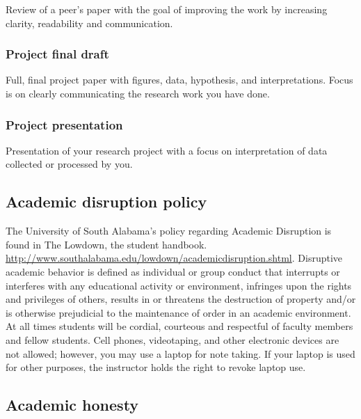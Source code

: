 \documentclass[11pt,]{article}
\begin{document}
Review of a peer's paper with the goal of improving the work by
increasing clarity, readability and communication.

\hypertarget{project-final-draft}{%
\subsubsection{Project final draft}\label{project-final-draft}}

Full, final project paper with figures, data, hypothesis, and
interpretations. Focus is on clearly communicating the research work you
have done.

\hypertarget{project-presentation}{%
\subsubsection{Project presentation}\label{project-presentation}}

Presentation of your research project with a focus on interpretation of
data collected or processed by you.

\newpage

\hypertarget{academic-disruption-policy}{%
\subsection{Academic disruption
policy}\label{academic-disruption-policy}}

The University of South Alabama's policy regarding Academic Disruption
is found in The Lowdown, the student handbook.
\url{http://www.southalabama.edu/lowdown/academicdisruption.shtml}.
Disruptive academic behavior is defined as individual or group conduct
that interrupts or interferes with any educational activity or
environment, infringes upon the rights and privileges of others, results
in or threatens the destruction of property and/or is otherwise
prejudicial to the maintenance of order in an academic environment. At
all times students will be cordial, courteous and respectful of faculty
members and fellow students. Cell phones, videotaping, and other
electronic devices are not allowed; however, you may use a laptop for
note taking. If your laptop is used for other purposes, the instructor
holds the right to revoke laptop use.

\hypertarget{academic-honesty}{%
\subsection{Academic honesty}\label{academic-honesty}}
\end{document}
